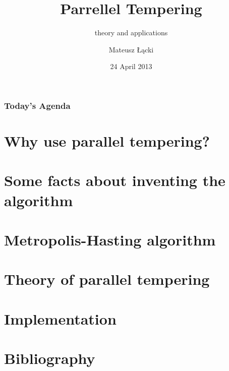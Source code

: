 \documentclass[xetex]{beamer}
\title[Parrellel Tempering]{Parrellel Tempering }
\subtitle{theory and applications}
\date{24 April 2013}
\author[Łącki]{Mateusz Łącki}
\institute[UW]{Uniwersytet Warszawski}
\begin{document}


	\begin{frame}
		\titlepage
	\end{frame}

	\begin{frame}
		\frametitle{Today's Agenda}
		\tableofcontents
	\end{frame}
	

	\section[Why bother?]{Why use parallel tempering?}
	
	\section[History]{Some facts about inventing the algorithm}

	\section[MH]{Metropolis-Hasting algorithm}

	\section[History]{Theory of parallel tempering}

	\section[History]{Implementation}

	\section[Sources]{Bibliography}
		

\end{document}
